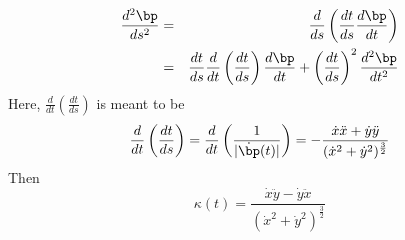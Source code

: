 \documentclass{article}
\begin{document}
\begin{eqnarray}
\frac{d^2 \bp}{ds^2} & = & \frac{d}{ds} \left(\frac{dt}{ds}\frac{d\bp}{dt}\right) \nonumber \\
 & = & \frac{dt}{ds} \frac{d}{dt}\left(\frac{dt}{ds}\right)\frac{d\bp}{dt} + \left(\frac{dt}{ds}\right)^2 \frac{d^2\bp}{dt^2}
\end{eqnarray}
Here, $\frac{d}{dt}\left(\frac{dt}{ds}\right)$ is meant to be
\begin{equation}
\label{}
\frac{d}{dt}\left(\frac{dt}{ds}\right) = \frac{d}{dt}\left(\frac{1}{|\dot{\bp}(t)|}\right) = -\frac{\dot{x}\ddot{x} + \dot{y}\ddot{y}}{(\dot{x}^2 + \dot{y}^2)^{\frac{3}{2}}}
\end{equation}
Then
\begin{equation}
\label{}
\kappa (t) = \frac{\dot{x}\ddot{y} - \dot{y}\ddot{x}}{(\dot{x}^2 + \dot{y}^2)^{\frac{3}{2}}}
\end{equation}
\end{document}
